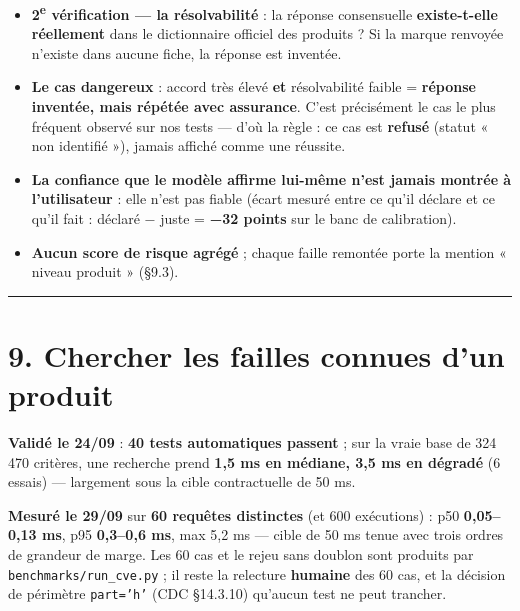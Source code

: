 \documentclass[11pt,a4paper]{article}
\begin{document}
\begin{itemize}  \item \textbf{2\textsuperscript{e} vérification — la résolvabilité} : la réponse consensuelle \textbf{existe-t-elle réellement} dans le dictionnaire officiel des produits ? Si la marque renvoyée n'existe dans aucune fiche, la réponse est inventée.
\end{itemize}

\begin{itemize}  \item \textbf{Le cas dangereux} : accord très élevé \textbf{et} résolvabilité faible = \textbf{réponse inventée, mais répétée avec assurance}. C'est précisément le cas le plus fréquent observé sur nos tests — d'où la règle : ce cas est \textbf{refusé} (statut « non identifié »), jamais affiché comme une réussite.
\end{itemize}

\begin{itemize}  \item \textbf{La confiance que le modèle affirme lui-même n'est jamais montrée à l'utilisateur} : elle n'est pas fiable (écart mesuré entre ce qu'il déclare et ce qu'il fait : déclaré − juste = \textbf{−32 points} sur le banc de calibration).
\end{itemize}

\begin{itemize}  \item \textbf{Aucun score de risque agrégé} ; chaque faille remontée porte la mention « niveau produit » (§9.3).
\end{itemize}

\medskip\hrule\medskip
\section*{9. Chercher les failles connues d'un produit}
\textbf{Validé le 24/09} : \textbf{40 tests automatiques passent} ; sur la vraie base de 324 470 critères, une recherche prend \textbf{1,5 ms en médiane, 3,5 ms en dégradé} (6 essais) — largement sous la cible contractuelle de 50 ms.

\textbf{Mesuré le 29/09} sur \textbf{60 requêtes distinctes} (et 600 exécutions) : p50 \textbf{0,05–0,13 ms}, p95 \textbf{0,3–0,6 ms}, max 5,2 ms — cible de 50 ms tenue avec trois ordres de grandeur de marge. Les 60 cas et le rejeu sans doublon sont produits par \texttt{benchmarks/run\_\allowbreak{}cve.py} ; il reste la relecture \textbf{humaine} des 60 cas, et la décision de périmètre \texttt{part='h'} (CDC §14.3.10) qu'aucun test ne peut trancher.
\end{document}
